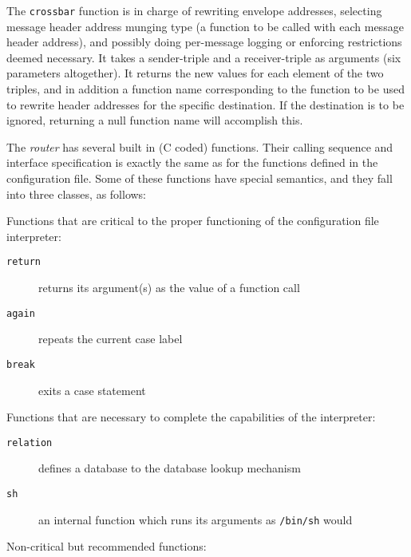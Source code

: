 The {\tt crossbar} function is in charge of rewriting envelope addresses,
selecting message header address munging type (a function to be called with
each message header address), and possibly doing per-message logging or
enforcing restrictions deemed necessary. It takes a sender-triple and a
receiver-triple as arguments (six parameters altogether). It returns the
new values for each element of the two triples, and in addition a function
name corresponding to the function to be used to rewrite header addresses
for the specific destination.  If the destination is to be ignored,
returning a null function name will accomplish this.

The {\em router\/} has several built in (C coded) functions.  Their calling
sequence and interface specification is exactly the same as for the
functions defined in the configuration file.  Some of these functions have
special semantics, and they fall into three classes, as follows:

Functions that are critical to the proper functioning of the configuration
file interpreter:

\begin{description}
\item[{\tt return}] \mbox{}

returns its argument(s) as the value of a function call

\item[{\tt again}] \mbox{}

repeats the current case label

\item[{\tt break}] \mbox{}

exits a case statement

\end{description}


Functions that are necessary to complete the capabilities of the
interpreter:

\begin{description}
\item[{\tt relation}] \mbox{}

defines a database to the database lookup mechanism

\item[{\tt sh}] \mbox{}

an internal function which runs its arguments as {\tt /bin/sh} would

\end{description}


Non-critical but recommended functions:

